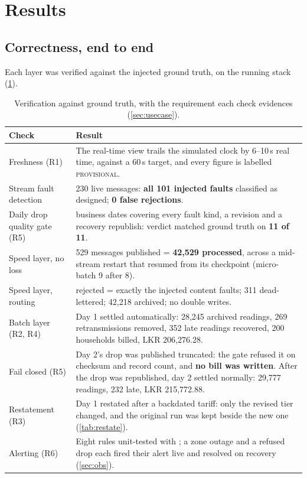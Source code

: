 \documentclass[11pt,a4paper]{article}
\newcommand{\code}[1]{\texttt{\detokenize{#1}}}
\begin{document}
\section{Results}
\label{sec:results}

\subsection{Correctness, end to end}
Each layer was verified against the injected ground truth, on the running stack
(\cref{tab:verify}).

\begin{table}[!htbp]
\centering\small
\caption{Verification against ground truth, with the requirement each check evidences (\cref{sec:usecase}).}
\label{tab:verify}
\begin{tabularx}{\linewidth}{@{}>{\raggedright\arraybackslash}p{3.3cm}>{\raggedright\arraybackslash}X@{}}
\toprule
\textbf{Check} & \textbf{Result} \\
\midrule
Freshness (R1) & The real-time view trails the simulated clock by 6--10\,s real time, against a 60\,s target, and every figure is labelled \textsc{provisional}. \\
Stream fault detection & 3{,}230 live messages: \textbf{all 101 injected faults} classified as designed; \textbf{0 false rejections}. \\
Daily drop quality gate (R5) & 11 business dates covering every fault kind, a revision and a recovery republish: verdict matched ground truth on \textbf{11 of 11}. \\
Speed layer, no loss & 42{,}529 messages published = \textbf{42{,}529 processed}, across a mid-stream restart that resumed from its checkpoint (micro-batch 9 after 8). \\
Speed layer, routing & 311 rejected = exactly the injected content faults; 311 dead-lettered; 42{,}218 archived; no double writes. \\
Batch layer (R2, R4) & Day 1 settled automatically: 28{,}245 archived readings, 269 retransmissions removed, 352 late readings recovered, 200 households billed, LKR 206{,}276.28. \\
Fail closed (R5) & Day 2's drop was published truncated: the gate refused it on checksum and record count, and \textbf{no bill was written}. After the drop was republished, day 2 settled normally: 29{,}777 readings, 232 late, LKR 215{,}772.88. \\
Restatement (R3) & Day 1 restated after a backdated tariff: only the revised tier changed, and the original run was kept beside the new one (\cref{tab:restate}). \\
Alerting (R6) & Eight rules unit-tested with \code{promtool}; a zone outage and a refused drop each fired their alert live and resolved on recovery (\cref{sec:obs}). \\
\bottomrule
\end{tabularx}
\end{table}
\end{document}
